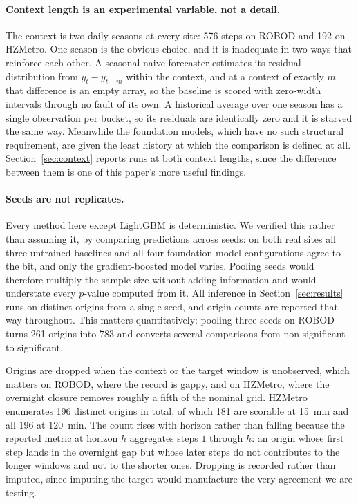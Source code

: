 \documentclass[utf8]{FrontiersinHarvard}
\newif\ifsecondrevisionmarkup
\newcommand{\rev}[1]{\ifsecondrevisionmarkup\textcolor{revisiontwo}{#1}\else#1\fi}
\theoremstyle{plain}
\theoremstyle{definition}
\theoremstyle{remark}
\begin{document}
\paragraph{Context length is an experimental variable, not a detail.}
The context is two daily seasons at every site: \num{576} steps on ROBOD and \num{192} on HZMetro. \rev{One season is the obvious choice, and it is inadequate in two ways that reinforce each other.} A seasonal naive forecaster estimates its residual distribution from $y_t - y_{t-m}$ within the context, and at a context of exactly $m$ that difference is an empty array, so the baseline \rev{is} scored with zero-width intervals through no fault of its own. A historical average over one season has a single observation per bucket, so its residuals are identically zero and it \rev{is} starved the same way. Meanwhile the foundation models, which have no such structural requirement, \rev{are} given the least history at which the comparison is defined at all. Section~\ref{sec:context} reports \rev{runs at both context lengths}, since the difference between them is one of this paper's more useful findings.

\paragraph{Seeds are not replicates.}
Every method here except LightGBM is deterministic. We verified this rather than assuming it, by comparing predictions across seeds: on both real sites all three untrained baselines and all four foundation model configurations agree to the bit, and only the gradient-boosted model varies. Pooling seeds would therefore multiply the sample size without adding information and would understate every $p$-value computed from it. All inference in Section~\ref{sec:results} runs on distinct origins from a single seed, and origin counts are reported that way throughout. This matters quantitatively: pooling three seeds on ROBOD turns \num{261} origins into \num{783} and converts several comparisons from non-significant to significant.

Origins are dropped when the context or the target window is unobserved, which matters on ROBOD, where the record is gappy, and on HZMetro, where the overnight closure removes roughly a fifth of the nominal grid. HZMetro enumerates \num{196} distinct origins in total, of which \num{181} are scorable at \SI{15}{\minute} and all \num{196} at \SI{120}{\minute}. The count rises with horizon rather than falling because the reported metric at horizon $h$ aggregates steps $1$ through $h$: an origin whose first step lands in the overnight gap but whose later steps do not contributes to the longer windows and not to the shorter ones. Dropping is recorded rather than imputed, since imputing the target would manufacture the very agreement we are testing.
\end{document}
